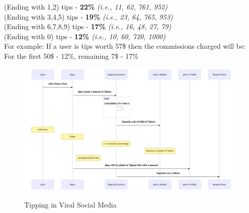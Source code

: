 \documentclass[conference]{IEEEtran}
\begin{document}
(Ending with 1,2) tips     - \textbf{22\%}   \textit{ (i.e., 11, 62, 761, 952)}\\
(Ending with 3,4,5) tips   - \textbf{19\%}   \textit{ (i.e., 23, 64, 765, 953)}\\
(Ending with 6,7,8,9) tips - \textbf{17\%}   \textit{(i.e., 16, 48, 27,  79)}\\
(Ending with 0) tips       - \textbf{12\%}   \textit{(i.e., 10, 60, 720, 1000)}\\


For example: If a user is tips worth 57\$ then the commissions charged will be: For the first     50\$ - 12\%, remaining 7\$  - 17\%\\

\begin{figure}
\includegraphics[width=\textwidth]{tips}\\
\caption{Tipping in Viral Social Media}
\end{figure}

\end{document}

